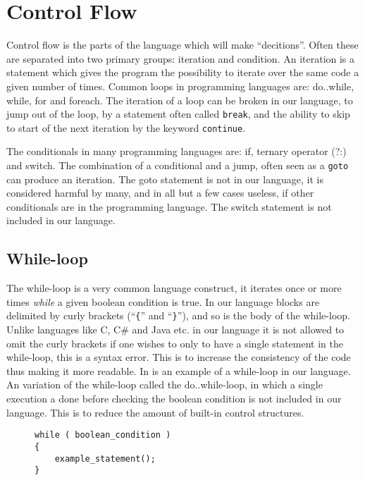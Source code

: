 
\section{Control Flow}
Control flow is the parts of the language which will make ``decitions''.
Often these are separated into two primary groups: iteration and condition. 
An iteration is a statement which gives the program the possibility to iterate over the same code a given number of times. 
Common loops in programming languages are: do..while, while, for and foreach. 
The iteration of a loop can be broken in our language, to jump out of the loop, by a statement often called \texttt{break}, and the ability to skip to start of the next iteration by the keyword \texttt{continue}.

The conditionals in many programming languages are: if, ternary operator (?:) and switch.
The combination of a conditional and a jump, often seen as a \texttt{goto} can produce an iteration. 
The goto statement is not in our language, it is considered harmful by many, and in all but a few cases useless, if other conditionals are in the programming language. \citep{DijkstraGoto}
The switch statement is not included in our language. 

\subsection{While-loop}
The while-loop is a very common language construct, it iterates once or more times \textit{while} a given boolean condition is true. 
In our language blocks are delimited by curly brackets (``\texttt{\{}'' and ``\texttt{\}}''), and so is the body of the while-loop. 
Unlike languages like C, C\# and Java etc. in our language it is not allowed to omit the curly brackets if one wishes to only to have a single statement in the while-loop, this is a syntax error. 
This is to increase the consistency of the code thus making it more readable. 
In  is an example of a while-loop in our language. 
An variation of the while-loop called the do..while-loop, in which a single execution a done before checking the boolean condition is not included in our language. 
This is to reduce the amount of built-in control structures. 

\begin{figure}[h]
\begin{lstlisting}[caption=An example of a while-loop, label=lst:whileExample]
while ( boolean_condition )
{
    example_statement();
}
\end{lstlisting}
\end{figure}
